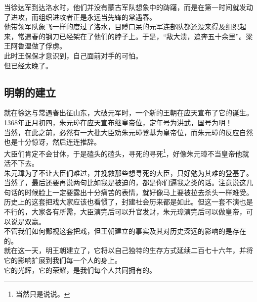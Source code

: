 \begin{multicols}{\theparacolNo}
当徐达军到达洛水时，他们并没有蒙古军队想象中的踌躇，而是在第一时间就发动了进攻，而组织进攻者正是永远当先锋的常遇春。\\

他带领军队象飞一样的度过了洛水，目瞪口呆的元军连部队都还没来得及组织起来，常遇春的钢刀已经架在了他们的脖子上。于是，“敌大溃，追奔五十余里”。梁王阿鲁温做了俘虏。\\

此时王保保才意识到，自己面前对手的可怕。\\

但已经太晚了。\\

\subsection{明朝的建立}
就在徐达与常遇春出征山东，大破元军时，一个新的王朝在应天宣布了它的诞生。\\

1368年正月初四，朱元璋在应天宣布继皇帝位，定年号为洪武，国号为明！\\

当然，在此之前，必然有一大批大臣劝朱元璋登基为皇帝位，而朱元璋的反应自然也是十分惊讶，然后连连推辞。\\

大臣们肯定不会甘休，于是磕头的磕头，寻死的寻死\footnote{当然只是说说。}，好像朱元璋不当皇帝他就活不下去。\\

朱元璋为了不让大臣们难过，并挽救那些想寻死的大臣，只好勉为其难的登基了。\\

当然了，最后还要再说两句比如我是被迫的，都是你们逼我之类的话。注意说这几句话的时候脸上一定要露出十分痛苦的表情，就好像马上要被拉去杀头一样难受。\\

历史上的这套把戏大家应该也看惯了，封建社会历来都是如此。但这一套不演也是不行的，大家各有所需，大臣演完后可以升官发财，朱元璋演完后可以做皇帝，可以说是双赢。\\

不管我们如何鄙视这套把戏，但王朝建立的事实及其对历史深远的影响的是存在的。\\

就在这一天，明王朝建立了，它将以自己独特的生存方式延续二百七十六年，并将它的影响扩展到我们每一个人的身上。\\

它的光辉，它的荣耀，是我们每个人共同拥有的。\\


\end{multicols}
